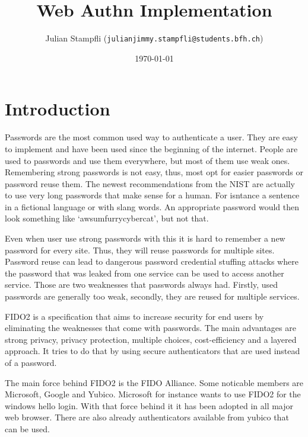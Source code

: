 \documentclass[a4paper, 11pt]{scrartcl}
\begin{document}
\title{Web Authn Implementation}
\date{\today} 
\author{ Julian Stampfli (\texttt{julianjimmy.stampfli@students.bfh.ch}) }
\maketitle
\setcounter{tocdepth}{2}
\tableofcontents
\clearpage

\section{Introduction}

Passwords are the most common used way to authenticate a user. They are easy to implement and have been used since the beginning of the internet. People are used to passwords and use them everywhere, but most of them use weak ones. Remembering strong passwords is not easy, thus, most opt for easier passwords or password reuse them. The newest recommendations from the NIST are actually to use very long passwords that make sense for a human. For isntance a sentence in a fictional language or with slang words. An appropriate password would then look something like `awsumfurrycybercat', but not that. \cite{nist:pw:blog}

Even when user use strong passwords with this it is hard to remember a new password for every site. Thus, they will reuse passwords for multiple sites. Password reuse can lead to dangerous password credential stuffing attacks where the password that was leaked from one service can be used to access another service. \cite{panda:pwreuse, xkcd:pwreuse} Those are two weaknesses that passwords always had. Firstly, used passwords are generally too weak, secondly, they are reused for multiple services. 

FIDO2 is a specification that aims to increase security for end users by eliminating the weaknesses that come with passwords. The main advantages are strong privacy, privacy protection, multiple choices, cost-efficiency and a layered approach. It tries to do that by using secure authenticators that are used instead of a password. \cite{yubico:whatIsFido2} 

The main force behind FIDO2 is the FIDO Alliance. Some noticable members are Microsoft, Google and Yubico. Microsoft for instance wants to use FIDO2 for the windows hello login. \cite{yubico:ms} With that force behind it it has been adopted in all major web browser. \cite{fido:browser} There are also already authenticators available from yubico that can be used. \cite{yubico:yubikey5}
\end{document}
